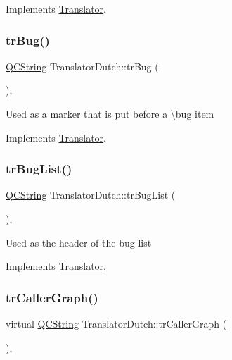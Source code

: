 Implements \mbox{\hyperlink{class_translator}{Translator}}.

\mbox{\label{class_translator_dutch_add919f86916e0494e966a4637a0ab19e}} 
\subsubsection{\texorpdfstring{trBug()}{trBug()}}
{\footnotesize\ttfamily \mbox{\hyperlink{class_q_c_string}{Q\+C\+String}} Translator\+Dutch\+::tr\+Bug (\begin{DoxyParamCaption}{ }\end{DoxyParamCaption})\hspace{0.3cm}{\ttfamily [inline]}, {\ttfamily [virtual]}}

Used as a marker that is put before a \textbackslash{}bug item 

Implements \mbox{\hyperlink{class_translator}{Translator}}.

\mbox{\label{class_translator_dutch_a243e10d7ef2cb19180708078b93ed1fb}} 
\subsubsection{\texorpdfstring{trBugList()}{trBugList()}}
{\footnotesize\ttfamily \mbox{\hyperlink{class_q_c_string}{Q\+C\+String}} Translator\+Dutch\+::tr\+Bug\+List (\begin{DoxyParamCaption}{ }\end{DoxyParamCaption})\hspace{0.3cm}{\ttfamily [inline]}, {\ttfamily [virtual]}}

Used as the header of the bug list 

Implements \mbox{\hyperlink{class_translator}{Translator}}.

\mbox{\label{class_translator_dutch_abff364dcd7a756f3de5cc12a6a55d76f}} 
\subsubsection{\texorpdfstring{trCallerGraph()}{trCallerGraph()}}
{\footnotesize\ttfamily virtual \mbox{\hyperlink{class_q_c_string}{Q\+C\+String}} Translator\+Dutch\+::tr\+Caller\+Graph (\begin{DoxyParamCaption}{ }\end{DoxyParamCaption})\hspace{0.3cm}{\ttfamily [inline]}, {\ttfamily [virtual]}}

